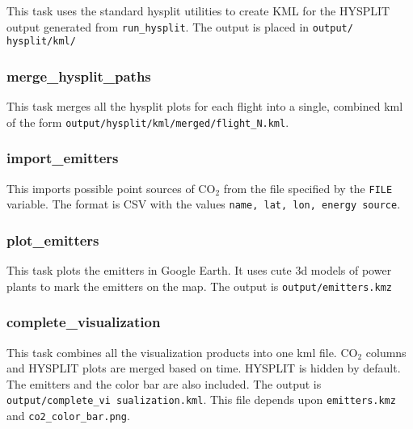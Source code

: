 \documentclass[12pt]{article}
\begin{document}
This task uses the standard hysplit utilities to create KML for the HYSPLIT output generated from \texttt{run\_hysplit}.  The output is placed in \texttt{output/ hysplit/kml/}

\subsubsection*{merge\_hysplit\_paths}

This task merges all the hysplit plots for each flight into a single, combined kml of the form \texttt{output/hysplit/kml/merged/flight\_N.kml}.

\subsubsection*{import\_emitters}

This imports possible point sources of CO$_2$ from the file specified by the \texttt{FILE} variable.  The format is CSV with the values \texttt{name, lat, lon, energy source}.

\subsubsection*{plot\_emitters}

This task plots the emitters in Google Earth.  It uses cute 3d models of power plants to mark the emitters on the map. The output is \texttt{output/emitters.kmz}

\subsubsection*{complete\_visualization}

This task combines all the visualization products into one kml file.  CO$_2$ columns and HYSPLIT plots are merged based on time.  HYSPLIT is hidden by default.  The emitters and the color bar are also included.  The output is \texttt{output/complete\_vi sualization.kml}.  This file depends upon \texttt{emitters.kmz} and \texttt{co2\_color\_bar.png}.
\end{document}
